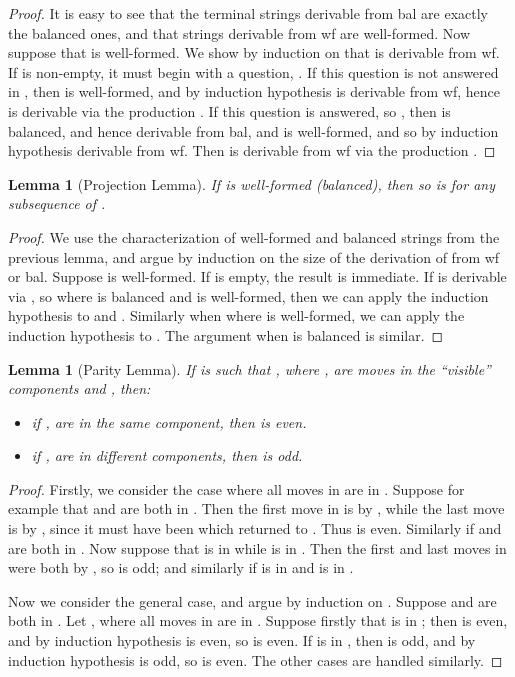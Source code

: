 \documentclass[11pt]{article}
\newtheorem{lemma}[theorem]{Lemma}
\begin{document}
\begin{proof} It is easy to see that the terminal strings derivable
from {\sc bal} are exactly the balanced ones, and that strings
derivable from {\sc wf} are well-formed. Now suppose that  is
well-formed. We show by induction on  that  is derivable
from {\sc wf}. If  is non-empty, it must begin with a question,
. If this question is not answered in , then  is
well-formed, and by induction hypothesis  is derivable from
{\sc wf}, hence  is derivable via the production . If this question is answered, so
, then  is balanced, and hence
derivable from {\sc bal}, and  is well-formed, and so by
induction hypothesis derivable from {\sc wf}. Then  is
derivable from {\sc wf} via the production . 
\end{proof}

\begin{lemma}[Projection Lemma]
If  is well-formed (balanced),
then
so is  for any subsequence
 of .
\end{lemma}

\begin{proof} We use the characterization of well-formed and
balanced strings from the previous lemma, and argue by induction
on the size of the derivation of  from {\sc wf} or {\sc bal}.
Suppose  is well-formed. If  is empty, the result is
immediate. If  is derivable via , so  where  is
balanced and  is well-formed, then we can apply the induction
hypothesis to  and . Similarly when  where 
is well-formed, we can apply the induction hypothesis to . The
argument when  is balanced is similar. 
\end{proof}

\begin{lemma}[Parity Lemma]
If  is such that , where
,  are moves in the ``visible'' components  and , then:
\begin{itemize}
\item if ,  are in the {\em same} component, then  is even.
\item if ,  are in {\em different} components, then  is odd.
\end{itemize}
\end{lemma}

\begin{proof} Firstly, we consider the case where all moves in 
are in . Suppose for example that  and  are both in .
Then the first move in  is by , while the last move is
by , since it must have been  which returned to .
Thus  is even. Similarly if  and  are both in . Now
suppose that  is in  while  is in . Then the first and
last moves in  were both by , so  is odd; and
similarly if  is in  and  is in .

Now we consider the general case, and argue by induction on .
Suppose  and  are both in . Let ,
where all moves in  are in . Suppose firstly that 
is in ; then  is even, and by induction hypothesis
 is even, so  is even. If  is
in , then  is odd, and by induction hypothesis  is odd, so  is even. The other cases are
handled similarly. 
\end{proof}
\end{document}
